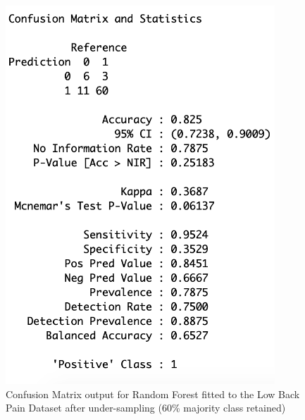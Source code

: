 \begin{figure}[!htbp]
    \centering
    \begin{minipage}{0.45\textwidth}
        \centering
        \includegraphics[width=0.9\textwidth]{ThesisTemplate/appendix/images/Chapter5Appendix/ConfusionMatrix60/LBP.png}
        \caption{Confusion Matrix output for Random Forest fitted to the Low Back Pain Dataset after under-sampling (60\% majority class retained)}
        \label{fig:my_label}
    \end{minipage}\hfill
    \begin{minipage}{0.45\textwidth}
        \centering

\end{minipage}
\end{figure}
